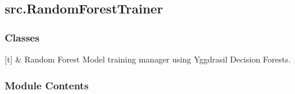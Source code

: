 \documentclass[letterpaper,10pt,english]{sphinxmanual}
\begin{document}
\sphinxstepscope


\subsection{src.RandomForestTrainer}
\label{\detokenize{autoapi/src/RandomForestTrainer/index:module-src.RandomForestTrainer}}\label{\detokenize{autoapi/src/RandomForestTrainer/index:src-randomforesttrainer}}\label{\detokenize{autoapi/src/RandomForestTrainer/index::doc}}

\subsubsection{Classes}
\label{\detokenize{autoapi/src/RandomForestTrainer/index:classes}}

\begin{savenotes}\sphinxattablestart
\sphinxthistablewithglobalstyle
\sphinxthistablewithnovlinesstyle
\centering
\begin{tabulary}{\linewidth}[t]{}
\sphinxtoprule
\sphinxtableatstartofbodyhook
\sphinxAtStartPar
{\hyperref[\detokenize{autoapi/src/RandomForestTrainer/index:src.RandomForestTrainer.RandomForestTrainer}]{}}
&
\sphinxAtStartPar
Random Forest Model training manager using Yggdrasil Decision Forests.
\\
\sphinxbottomrule
\end{tabulary}
\sphinxtableafterendhook\par
\sphinxattableend\end{savenotes}


\subsubsection{Module Contents}
\label{\detokenize{autoapi/src/RandomForestTrainer/index:module-contents}}

\begin{fulllineitems}
\label{\detokenize{autoapi/src/RandomForestTrainer/index:src.RandomForestTrainer.RandomForestTrainer}}
\pysigstartsignatures
\pysiglinewithargsret
{}
{\sphinxparamcomma {}}
{}
\pysigstopsignatures
\end{fulllineitems}
\end{document}
